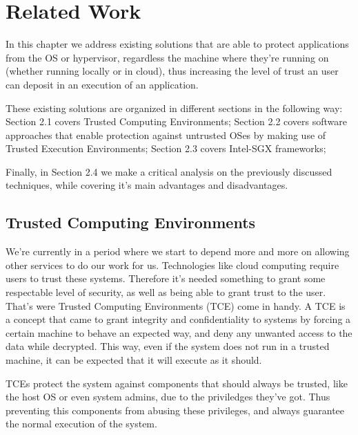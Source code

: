 \chapter{Related Work}
\label{cha:related_work}

In this chapter we address existing solutions that are able to protect applications from the OS or hypervisor, regardless the machine where they're running on (whether running locally or in cloud), thus increasing the level of trust an user can deposit in an execution of an application.

These existing solutions are organized in different sections in the following way: Section 2.1 covers Trusted Computing Environments; Section 2.2 covers software approaches that enable protection against untrusted OSes by making use of Trusted Execution Environments; Section 2.3 covers Intel-SGX frameworks; 

Finally, in Section 2.4 we make a critical analysis on the previously discussed techniques, while covering it's main advantages and disadvantages.


\section{Trusted Computing Environments} %
\label{sec:tce}
We're currently in a period where we start to depend more and more on allowing other services to do our work for us. Technologies like cloud computing require users to trust these systems. Therefore it's needed something to grant some respectable level of security, as well as being able to grant trust to the user. That's were Trusted Computing Environments (TCE) come in handy.
A TCE is a concept that came to grant integrity and confidentiality to systems by forcing a certain machine to behave an expected way, and deny any unwanted access to the data while decrypted. This way, even if the system does not run in a trusted machine, it can be expected that it will execute as it should. 

TCEs protect the system against components that should always be trusted, like the host OS or even system admins, due to the priviledges they've got. Thus preventing this components from abusing these privileges, and always guarantee the normal execution of the system. 

